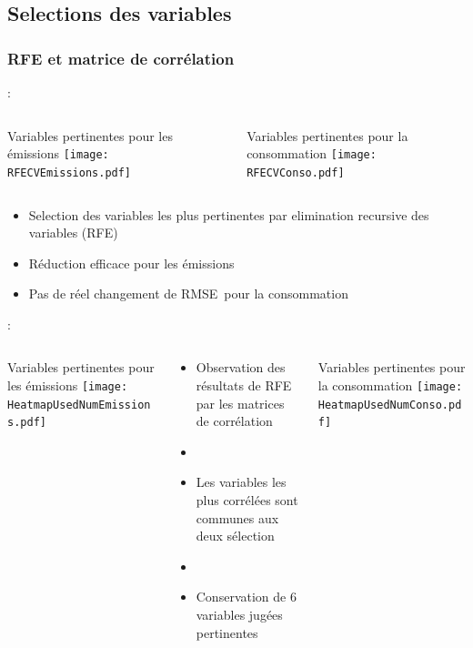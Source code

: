 \documentclass[8pt,aspectratio=169,hyperref={unicode=true}]{beamer}
\begin{document}
\subsection{Selections des variables}
\subsubsection{RFE et matrice de corrélation}
\begin{frame}{\insertsection : \insertsubsection}{\insertsubsubsection}
  \begin{columns}[t]
    \begin{column}{.5\textwidth}
      \centering
      Variables pertinentes pour les émissions
      \texttt{[image: RFECVEmissions.pdf]}
    \end{column}
    \begin{column}{.5\textwidth}
      \centering
      Variables pertinentes pour la consommation
      \texttt{[image: RFECVConso.pdf]}
    \end{column}
  \end{columns}
  \begin{itemize}
    \item Selection des variables les plus pertinentes par elimination recursive des variables (RFE)
    \item Réduction efficace pour les émissions
    \item Pas de réel changement de RMSE pour la consommation
  \end{itemize}
\end{frame}

\begin{frame}{\insertsection : \insertsubsection}{\insertsubsubsection}
  \begin{columns}[t]
    \begin{column}{.33\textwidth}
      \centering
      Variables pertinentes pour les émissions
      \texttt{[image: HeatmapUsedNumEmissions.pdf]}
    \end{column}
    \begin{column}{.33\textwidth}
      \begin{itemize}
        \item Observation des résultats de RFE par les matrices de corrélation
        \item[]
        \item Les variables les plus corrélées sont communes aux deux sélection
        \item[]
        \item Conservation de 6 variables jugées pertinentes
      \end{itemize}
    \end{column}
    \begin{column}{.33\textwidth}
      \centering
      Variables pertinentes pour la consommation
      \texttt{[image: HeatmapUsedNumConso.pdf]}
    \end{column}
  \end{columns}
\end{frame}
\end{document}
